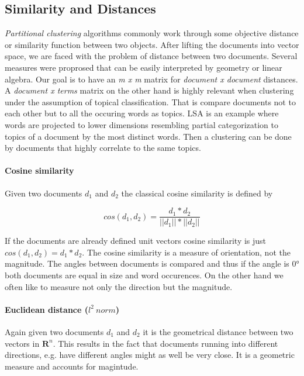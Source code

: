   \subsection{Similarity and Distances}
    \emph{Partitional clustering} algorithms commonly work through some objective distance or similarity function between two objects. After lifting the documents into vector space, we are faced with the problem of distance between two documents. Several measures were proprosed that can be easily interpreted by geometry or linear algebra. Our goal is to have an \emph{m x m} matrix for \emph{document x document} distances. A \emph{document x terms} matrix on the other hand is highly relevant when clustering under the assumption of topical classification. That is compare documents not to each other but to all the occuring words as topics. LSA is an example where words are projected to lower dimensions resembling partial categorization to topics of a document by the most distinct words. Then a clustering can be done by documents that highly correlate to the same topics.

    \paragraph{Cosine similarity}
    Given two documents $d_1$ and $d_2$ the classical cosine similarity is defined by

    \begin{equation}
      cos(d_1, d_2) = \frac{d_1 * d_2}{||d_1|| * ||d_2||}
    \end{equation}

    If the documents are already defined unit vectors cosine similarity is just $cos(d_1, d_2) = d_1 * d_2$. The cosine similarity is a measure of orientation, not the magnitude. The angles between documents is compared and thus if the angle is 0° both documents are equal in size and word occurences. On the other hand we often like to measure not only the direction but the magnitude.

    \paragraph{Euclidean distance ($l^2\:norm$)}
    Again given two documents $d_1$ and $d_2$ it is the geometrical distance between two vectors in $\mathbf{R}^n$. This results in the fact that documents running into different directions, e.g. have different angles might as well be very close. It is a geometric measure and accounts for magintude.

